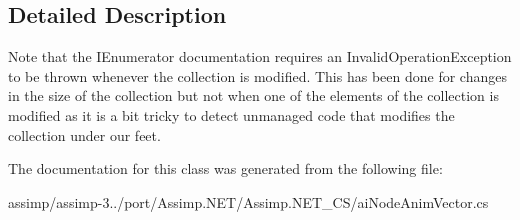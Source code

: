 \subsection{Detailed Description}
Note that the I\+Enumerator documentation requires an Invalid\+Operation\+Exception to be thrown whenever the collection is modified. This has been done for changes in the size of the collection but not when one of the elements of the collection is modified as it is a bit tricky to detect unmanaged code that modifies the collection under our feet. 

The documentation for this class was generated from the following file\+:\begin{DoxyCompactItemize}
\item 
assimp/assimp-\/3../port/\+Assimp.\+N\+E\+T/\+Assimp.\+N\+E\+T\+\_\+\+C\+S/ai\+Node\+Anim\+Vector.\+cs\end{DoxyCompactItemize}
